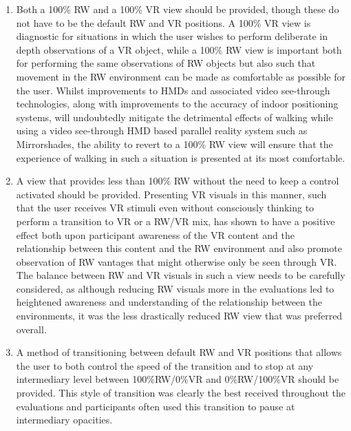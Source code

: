 \begin{enumerate}
	\item Both a 100\% RW and a 100\% VR view should be provided, though these do not have to be the default RW and VR positions. A 100\% VR view is diagnostic for situations in which the user wishes to perform deliberate in depth observations of a VR object, while a 100\% RW view is important both for performing the same observations of RW objects but also such that movement in the RW environment can be made as comfortable as possible for the user. Whilst improvements to HMDs and associated video see-through technologies, along with improvements to the accuracy of indoor positioning systems, will undoubtedly mitigate the detrimental effects of walking while using a video see-through HMD based parallel reality system such as Mirrorshades, the ability to revert to a 100\% RW view will ensure that the experience of walking in such a situation is presented at its most comfortable.
	\item A view that provides less than 100\% RW without the need to keep a control activated should be provided. Presenting VR visuals in this manner, such that the user receives VR stimuli even without consciously thinking to perform a transition to VR or a RW/VR mix, has shown to have a positive effect both upon participant awareness of the VR content and the relationship between this content and the RW environment and also promote observation of RW vantages that might otherwise only be seen through VR. The balance between RW and VR visuals in such a view needs to be carefully considered, as although reducing RW visuals more in the evaluations led to heightened awareness and understanding of the relationship between the environments, it was the less drastically reduced RW view that was preferred overall.
	\item A method of transitioning between default RW and VR positions that allows the user to both control the speed of the transition and to stop at any intermediary level between 100\%RW/0\%VR and 0\%RW/100\%VR should be provided. This style of transition was clearly the best received throughout the evaluations and participants often used this transition to pause at intermediary opacities.
\end{enumerate}

